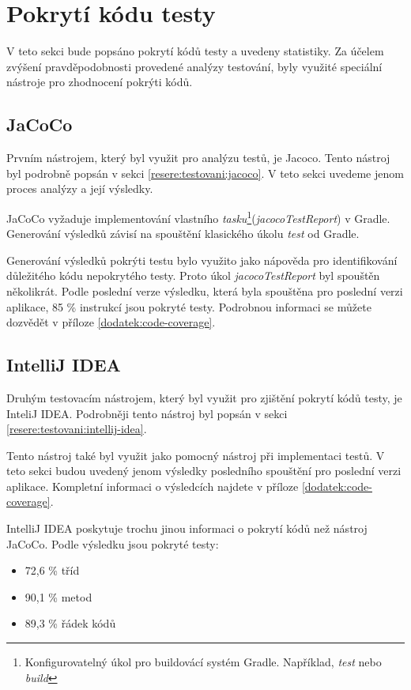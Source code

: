 \section{Pokrytí kódu testy}\label{testovani:pokryti}
    V teto sekci bude popsáno pokrytí kódů testy a uvedeny statistiky. Za účelem zvýšení pravděpodobnosti provedené analýzy testování, byly využité speciální nástroje pro zhodnocení pokrýti kódů.
    \subsection{JaCoCo}
    Prvním nástrojem, který byl využit pro analýzu testů, je Jacoco. Tento nástroj byl podrobně popsán v sekci \ref{resere:testovani:jacoco}. V teto sekci uvedeme jenom proces analýzy a její výsledky.
    
    JaCoCo vyžaduje implementování vlastního \textit{tasku}\footnote{Konfigurovatelný úkol pro buildovácí systém Gradle. Například, \textit{test} nebo \textit{build}}(\textit{jacocoTestReport}) v Gradle. Generování výsledků závisí na spouštění klasického úkolu \textit{test} od Gradle. 
    
    Generování výsledků pokrýti testu bylo využito jako nápověda pro identifikování důležitého kódu nepokrytého testy. Proto úkol \textit{jacocoTestReport} byl spouštěn několikrát. Podle poslední verze výsledku, která byla spouštěna pro poslední verzi aplikace, 85 \% instrukcí jsou pokryté testy. Podrobnou informaci se můžete dozvědět v příloze \ref{dodatek:code-coverage}.
    \subsection{IntelliJ IDEA}
    Druhým testovacím nástrojem, který byl využit pro zjištění pokrytí kódů testy, je InteliJ IDEA. Podrobněji tento nástroj byl popsán v sekci \ref{resere:testovani:intellij-idea}. 
    
    Tento nástroj také byl využit jako pomocný nástroj při implementaci testů. V teto sekci budou uvedený jenom výsledky posledního spouštění pro poslední verzi aplikace. Kompletní informaci o výsledcích najdete v příloze \ref{dodatek:code-coverage}.
    
    IntelliJ IDEA poskytuje trochu jinou informaci o pokrytí kódů než nástroj JaCoCo. Podle výsledku jsou pokryté testy:
    \begin{itemize}
            \item 72,6 \% tříd
            \item 90,1 \% metod
            \item 89,3 \% řádek kódů
    \end{itemize}